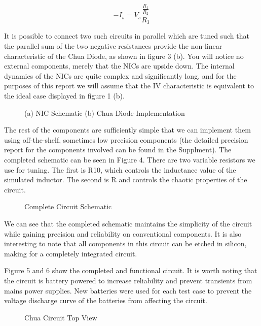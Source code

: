 \documentclass[jou,apacite]{apa6}
\begin{document}
\begin{equation}
-I_s = V_s \frac{\frac{R_1}{R_2}}{R_3}
\end{equation}

It is possible to connect two such circuits in parallel which are tuned such that the parallel sum of the two negative resistances provide the non-linear characteristic of the Chua Diode, as shown in figure 3 (b). You will notice no external components, merely that the NICs are upside down. The internal dynamics of the NICs are quite complex and significantly long, and for the purposes of this report we will assume that the IV characteristic is equivalent to the ideal case displayed in figure 1 (b). 

\begin{figure}[H]
\caption{(a) NIC Schematic (b) Chua Diode Implementation}
\endminipage\hfill
{}
\endminipage
\end{figure}

The rest of the components are sufficiently simple that we can implement them using off-the-shelf, sometimes low precision components (the detailed precision report for the components involved can be found in the Supplment). The completed schematic can be seen in Figure 4. There are two variable resistors we use for tuning. The first is R10, which controls the inductance value of the simulated inductor. The second is R and controls the chaotic properties of the circuit.

\begin{figure}[H]
\caption{Complete Circuit Schematic}
\end{figure}

We can see that the completed schematic maintains the simplicity of the circuit while gaining precision and reliability on conventional components. It is also interesting to note that all components in this circuit can be etched in silicon, making for a completely integrated circuit. 

Figure 5 and 6 show the completed and functional circuit. It is worth noting that the circuit is battery powered to increase reliability and prevent transients from mains power supplies. New batteries were used for each test case to prevent the voltage discharge curve of the batteries from affecting the circuit.

\begin{figure}[H]
\caption{Chua Circuit Top View}
\end{figure}
\end{document}
